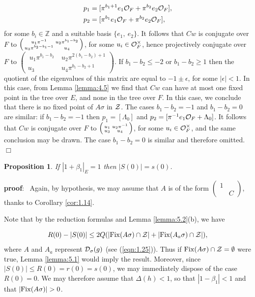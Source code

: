 \documentclass[12pt,letterpaper]{article}
\newtheorem{proposition}[theorem]{Proposition}
\def\ddd{{\cal D}}
\def\zz{{\cal Z}}
\def\zzz{\mathbb{Z}}
\def\pf{{\bf proof}:\ }
\def\qed{$\Box$}
\def\off{{\cal O}_F}
\begin{document}
\begin{equation}
\begin{split}
&p_1 = [\pi^{b_1+1}e_1\off + \pi^{b_2}e_2\off ],\\
&p_2 = [\pi^{b_1}e_1\off + \pi^{b_2}e_2\off ],
\end{split}
\label{eqn:5.5}
\end{equation}
for some $b_i\in\zzz$ and a suitable basis $\{e_1,\ e_2\}$. It follows that
$Cw$ is conjugate over $F$ to
$\left(\smallmatrix u_1\pi^{-1}&u_2\pi^{b_1-b_2}\\ u_3\pi^{b_2-b_1-1}&
u_4\endsmallmatrix\right)$,
for some $u_i\in \off^{\times}$, hence projectively conjugate over $F$ to
$\left(\begin{array}{cc} \ u_1\pi^{b_1-b_2}\ &u_2\pi^{2(b_1-b_2)+1}\\u_3&
u_4\pi^{b_1-b_2+1}\end{array}\right)$. If $b_1-b_2\leq -2$ or
$b_1-b_2\geq 1$ then the quotient of the eigenvalues
of this matrix are equal to $-1 \pm \epsilon$, for some
$|\epsilon |<1$. 
In this case, from Lemma \ref{lemma:4.5} we find that
$Cw$ can have at most one fixed point in the tree over $E$,
and none in the tree over $F$. In this case,
we conclude that
there is no fixed point of $A\sigma$ in $\zz$. The cases $b_1-b_2=-1$
and $b_1-b_2=0$ are similar: if $b_1-b_2=-1$ then $p_1=[\Lambda_0]$
and $p_2=[\pi^{-1}e_1\off +\Lambda_0]$. It follows that
$Cw$ is conjugate over $F$ to
$\left(\smallmatrix u_1&u_2\pi^{-1}\\ u_3&u_4\endsmallmatrix\right)$,
for some $u_i\in \off^{\times}$, and the same conclusion may be drawn.
The case $b_1-b_2=0$ is similar and therefore omitted.  
\qed

\begin{proposition}
\label{prop:5.6}
If $|1+\beta_1|_E = 1$ then $|S(0)| = s(0)$.
\end{proposition}

\pf 
Again, by hypothesis, we may assume that $A$ is of the form
$\left(\begin{array}{cc}
1&\ \\\ &C\end{array}\right)$, thanks to Corollary
\ref{cor:1.14}.
 
Note that by the reduction formulas and Lemma \ref{lemma:5.2}(b), we have

\begin{equation}
R(0) - |S(0)| \leq 2Q(|{\rm Fix}(A\sigma )\cap \zz |
+|{\rm Fix}(A_a\sigma )\cap \zz |),
\label{eqn:5.7}
\end{equation}
where $A$ and $A_a$ represent $\ddd_\sigma (g)$ (see (\ref{eqn:1.25})). 
Thus if ${\rm Fix}(A\sigma )\cap\zz = \emptyset$ were true, 
Lemma \ref{lemma:5.1}
would imply the result. Moreover, since
$|S(0)| \leq R(0) = r(0) = s(0)$, we may immediately dispose of the
case $R(0) = 0$. We may therefore assume that $\Delta (h) < 1$, so that
$|1-\beta_1|<1$ and that $|{\rm Fix}(A\sigma )|>0$.
 
\end{document}
